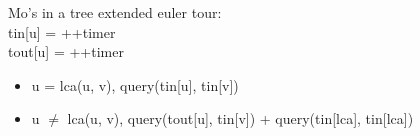 
Mo's in a tree extended euler tour:
\\
tin[u] = ++timer
\\
tout[u] = ++timer 

\begin{itemize}
\item u = lca(u, v), query(tin[u], tin[v])
\item u $\neq$ lca(u, v), query(tout[u], tin[v]) + query(tin[lca], tin[lca]) 
\end{itemize}

